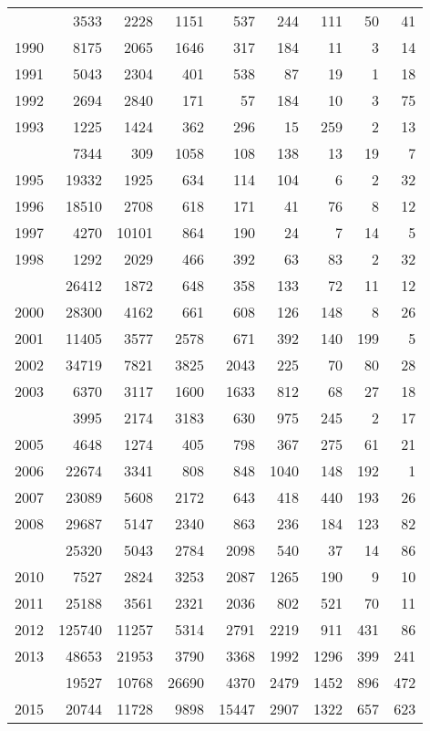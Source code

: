 \documentclass[
]{article}
\begin{document}
\begin{longtable}[t]{lrrrrrrrr}
\endfoot
\bottomrule
\endlastfoot
1989 & 3533 & 2228 & 1151 & 537 & 244 & 111 & 50 & 41\\
1990 & 8175 & 2065 & 1646 & 317 & 184 & 11 & 3 & 14\\
1991 & 5043 & 2304 & 401 & 538 & 87 & 19 & 1 & 18\\
1992 & 2694 & 2840 & 171 & 57 & 184 & 10 & 3 & 75\\
1993 & 1225 & 1424 & 362 & 296 & 15 & 259 & 2 & 13\\
\addlinespace
1994 & 7344 & 309 & 1058 & 108 & 138 & 13 & 19 & 7\\
1995 & 19332 & 1925 & 634 & 114 & 104 & 6 & 2 & 32\\
1996 & 18510 & 2708 & 618 & 171 & 41 & 76 & 8 & 12\\
1997 & 4270 & 10101 & 864 & 190 & 24 & 7 & 14 & 5\\
1998 & 1292 & 2029 & 466 & 392 & 63 & 83 & 2 & 32\\
\addlinespace
1999 & 26412 & 1872 & 648 & 358 & 133 & 72 & 11 & 12\\
2000 & 28300 & 4162 & 661 & 608 & 126 & 148 & 8 & 26\\
2001 & 11405 & 3577 & 2578 & 671 & 392 & 140 & 199 & 5\\
2002 & 34719 & 7821 & 3825 & 2043 & 225 & 70 & 80 & 28\\
2003 & 6370 & 3117 & 1600 & 1633 & 812 & 68 & 27 & 18\\
\addlinespace
2004 & 3995 & 2174 & 3183 & 630 & 975 & 245 & 2 & 17\\
2005 & 4648 & 1274 & 405 & 798 & 367 & 275 & 61 & 21\\
2006 & 22674 & 3341 & 808 & 848 & 1040 & 148 & 192 & 1\\
2007 & 23089 & 5608 & 2172 & 643 & 418 & 440 & 193 & 26\\
2008 & 29687 & 5147 & 2340 & 863 & 236 & 184 & 123 & 82\\
\addlinespace
2009 & 25320 & 5043 & 2784 & 2098 & 540 & 37 & 14 & 86\\
2010 & 7527 & 2824 & 3253 & 2087 & 1265 & 190 & 9 & 10\\
2011 & 25188 & 3561 & 2321 & 2036 & 802 & 521 & 70 & 11\\
2012 & 125740 & 11257 & 5314 & 2791 & 2219 & 911 & 431 & 86\\
2013 & 48653 & 21953 & 3790 & 3368 & 1992 & 1296 & 399 & 241\\
\addlinespace
2014 & 19527 & 10768 & 26690 & 4370 & 2479 & 1452 & 896 & 472\\
2015 & 20744 & 11728 & 9898 & 15447 & 2907 & 1322 & 657 & 623\\

\end{longtable}
\end{document}
